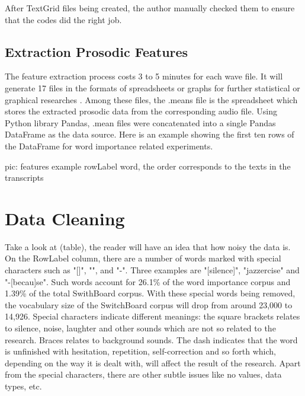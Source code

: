 After TextGrid files being created, the author manually checked them to ensure that the codes did the right job.

\subsection{Extraction Prosodic Features}
The feature extraction process costs 3 to 5 minutes for each wave file. It will generate 17 files in the formats of spreadsheets or graphs for further statistical or graphical researches \citep{Xu2013}. Among these files, the .means file is the spreadsheet which stores the extracted prosodic data from the corresponding audio file. Using Python library Pandas, .mean files were concatenated into a single Pandas DataFrame as the data source. Here is an example showing the first ten rows of the DataFrame for word importance related experiments.

pic: features example  rowLabel word, the order corresponds to the texts in the transcripts 

\section{Data Cleaning}

Take a look at (table), the reader will have an idea that how noisy the data is. On the RowLabel column, there are a number of words marked with special characters such as "[]", "{}", and "-". Three examples are "[silence]", "{jazzercise}" and "-[becau]se". Such words account for 26.1\% of the word importance corpus and 1.39\% of the total SwithBoard corpus. With these special words being removed, the vocabulary size of the SwitchBoard corpus will drop from around 23,000 to 14,926. Special characters indicate different meanings: the square brackets relates to silence, noise, laughter and other sounds which are not so related to the research. Braces relates to background sounds. The dash indicates that the word is unfinished with hesitation, repetition, self-correction and so forth which, depending on the way it is dealt with, will affect the result of the research.  Apart from the special characters, there are other subtle issues like no values, data types, etc. 

